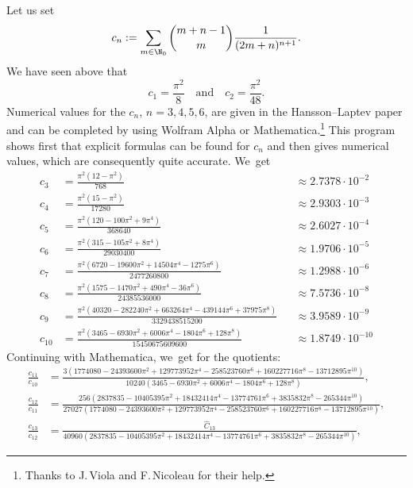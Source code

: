 Let us set
\begin{equation}\label{eq:defcn}
c_n := \sum_{m\in\N_0} \binom{m+n-1}{m} \frac{1}{(2m+n)^{n+1}}.
\end{equation}
We have seen above that
\[
c_1=\frac{\pi^2}8 \quad \text{and}\quad
c_2 = \frac{\pi^2}{48}.
\]
Numerical values for the $c_n$, $n=3,4,5,6$, are given in the Hansson--Laptev paper \cite{HL} and can be completed by using Wolfram Alpha or Mathematica.\footnote{Thanks to J.\,Viola and F.\,Nicoleau for their help.}
This program shows first that explicit formulas can be found for $c_n$ and then gives numerical values, which are consequently quite accurate. We~get
{\smaller\smaller
\[
\begin{aligned}
c_3 & = \frac{\pi^2(12-\pi^2)}{768} &&\approx 2.7378\cdot10^{-2}\\
c_4 & = \frac{\pi^2 (15-\pi^2)}{17280}&&\approx 2.9303 \cdot  10^{-3}\\
c_5& = \frac{\pi^2 (120-100\pi^2 + 9 \pi^4)}{368640}&&\approx 2.6027\cdot  10^{-4}\\
c_6&= \frac{\pi^2(315-105 \pi^2+ 8 \pi^4)}{29030400}&&\approx 1.9706 \cdot  10^{-5}\\
c_7&=\frac{\pi^2 (6720 - 19600 \pi^2 + 14504 \pi^4 - 1275 \pi^6)}{2477260800}&&\approx 1.2988\cdot 10^{-6}\\
c_8 &= \frac{\pi^2 (1575 - 1470 \pi^2 + 490 \pi ^4 - 36 \pi ^6)}{24385536000}&&\approx 7.5736\cdot10^{-8}\\
c_9&=\frac{\pi^2(40 320 - 282 240 \pi^2 + 663 264 \pi^4 - 439 144 \pi^6 + 37975 \pi^8)}{3329438515200}&&\approx 3.9589\cdot  10^{-9}\\
c_{10}&= \frac{\pi^2 (3465 - 6930 \pi^2 + 6006 \pi ^4 - 1804 \pi^6 + 128 \pi ^8)}{15450675609600}&&\approx1.8749\cdot10^{-10}
\end{aligned}
\]
}%
Continuing with Mathematica, we~get for the quotients:
{\smaller\smaller
\begin{align*}
\frac{c_{11}}{c_{10}} & = \frac{3 \left(1774080 - 24393600 \pi ^2 + 129773952 \pi ^4 - 258523760 \pi ^6 + 160227716 \pi ^8 - 13712895 \pi ^{10}\right)}{10240
\left(3465-6930 \pi ^2+6006 \pi ^4-1804 \pi ^6+128 \pi ^8\right)}, \\
\frac{c_{12}}{c_{11}} & = \frac{256 \left(2837835-10405395 \pi ^2 + 18432414 \pi ^4 - 13774761 \pi ^6 + 3835832 \pi ^8 - 265344 \pi ^{10}\right)}{27027
(1774080 \!-\! 24393600 \pi ^2 \!+\! 129773952 \pi ^4 \!-\! 258523760 \pi ^6 \!+\! 160227716 \pi ^8 \!-\! 13712895 \pi ^{10})},\\
\frac{c_{13}}{c_{12}} & = \frac{\hat C_{13}}{40960 \left(2837835 - 10405395 \pi ^2 + 18432414 \pi ^4 - 13774761 \pi ^6 + 3835832 \pi ^8 - 265344 \pi ^{10}\right)},
\end{align*}
}%
